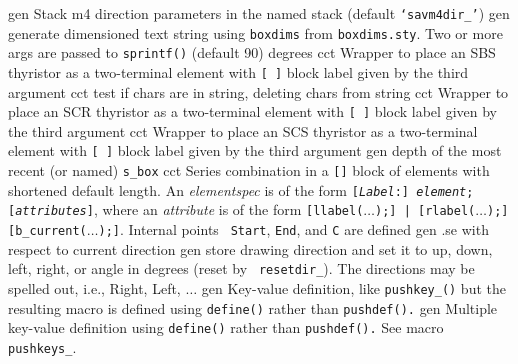%
  {gen}%
  {Stack m4 direction parameters in the named stack
    (default {\tt `savm4dir\_'})}%
%
  {gen}%
  {generate dimensioned text string using {\tt{}boxdims} from
    {\tt boxdims.sty}. Two or more args are passed to {\tt sprintf()}%
   (default 90) degrees }%
%
  {cct}%
  {Wrapper to place an SBS thyristor as a two-terminal element with
   {\tt [ ]} block label given by the third argument
    }%
%
  {cct}%
  {test if chars are in string, deleting chars from string}%
%
  {cct}%
  {Wrapper to place an SCR thyristor as a two-terminal element with
   {\tt [ ]} block label given by the third argument
    }%
%
  {cct}%
  {Wrapper to place an SCS thyristor as a two-terminal element with
   {\tt [ ]} block label given by the third argument
    }%
%
  {gen}%
  {depth of the most recent (or named) {\tt s\_box}%
    }%
%
  {cct}%
  { Series combination in a {\tt []} block of elements
    with shortened default length.  An {\sl elementspec} is of the
    form {\tt [{\sl Label}:] {\sl element}; [{\sl attributes}]},
    where an {\sl attribute} is of the form {\tt [llabel($\ldots$);] |
    [rlabel($\ldots$);] [b\_current($\ldots$);]}.  Internal points {\tt
    Start}, {\tt End}, and {\tt C} are defined
    }%
%
  {gen}%
  {.se with respect to current direction}%
%
  {gen}%
  {store drawing direction and set it to
    up, down, left, right, or angle in degrees (reset by {\tt
    resetdir\_}).  The directions may be spelled out, i.e., Right,
    Left, $\ldots$
   }%
%
  {gen}%
  {Key-value definition, like {\tt pushkey\_()} but the resulting
  macro is defined using {\tt define()} rather than {\tt pushdef().}%
   }%
%
  {gen}%
  {Multiple key-value definition using {\tt define()} rather than
   {\tt pushdef().} See macro {\tt pushkeys\_}.
   }%
